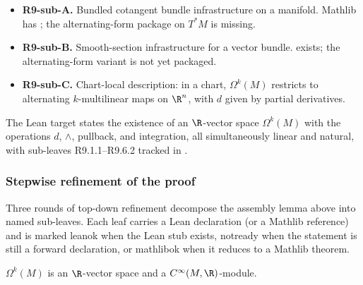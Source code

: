 \begin{itemize}
\item \textbf{R9-sub-A.}  Bundled cotangent bundle infrastructure on a
  manifold.  Mathlib has ; the alternating-form
  package on \(T^{*}M\) is missing.
\item \textbf{R9-sub-B.}  Smooth-section infrastructure for a vector
  bundle.  
  exists; the alternating-form variant is not yet packaged.
\item \textbf{R9-sub-C.}  Chart-local description: in a chart,
  \(\Omega^{k}(M)\) restricts to alternating \(k\)-multilinear maps on
  \(\R^{n}\), with \(d\) given by partial derivatives.
\end{itemize}

\begin{theorem}
\label{input:bundled-omega-k}
The Lean target
 states
the existence of an \(\R\)-vector space \(\Omega^{k}(M)\) with the
operations \(d\), \(\wedge\), pullback, and integration, all
simultaneously linear and natural, with sub-leaves R9.1.1--R9.6.2
tracked in .
\leanok
\end{theorem}


\subsubsection*{Stepwise refinement of the proof}

Three rounds of top-down refinement decompose the assembly
lemma above into named sub-leaves.  Each leaf carries a Lean
declaration (or a Mathlib reference) and is marked
\textsf{leanok} when the Lean stub exists, \textsf{notready}
when the statement is still a forward declaration, or
\textsf{mathlibok} when it reduces to a Mathlib theorem.

\begin{lemma}
\label{lem:bundled-forms-algebra}
$\Omega^{k}(M)$ is an $\R$-vector space and a $C^{\infty}(M, \R)$-module.
\leanok
\end{lemma}

